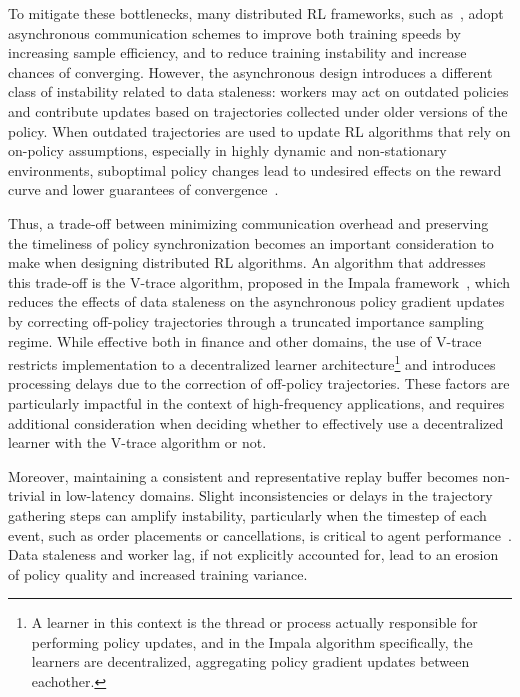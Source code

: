 To mitigate these bottlenecks, many distributed RL frameworks, such as~\cite{Espeholt2018, Mnih2016, Paine2019},
adopt asynchronous communication schemes
to improve both training speeds by increasing sample efficiency, and to reduce training instability and increase chances of converging.
However, the asynchronous design introduces a different class of instability related to data staleness:
workers may act on outdated policies and contribute updates based on trajectories collected under older versions of the policy.
When outdated trajectories are used to update RL algorithms that rely on on-policy assumptions,
especially in highly dynamic and non-stationary environments,
suboptimal policy changes lead to undesired effects on the reward curve and lower guarantees of convergence~\citep{Dai2018}.

Thus, a trade-off between minimizing communication overhead and preserving the timeliness of policy synchronization
becomes an important consideration to make when designing distributed RL algorithms.
An algorithm that addresses this trade-off is the V-trace algorithm, proposed in the Impala framework~\citep{Espeholt2018},
which reduces the effects of data staleness on the asynchronous policy gradient updates by
correcting off-policy trajectories through a truncated importance sampling regime.
While effective both in finance and other domains,
the use of V-trace restricts implementation to a decentralized learner architecture\footnote{
    A learner in this context is the thread or process actually responsible for performing policy updates,
    and in the Impala algorithm specifically, the learners are decentralized, aggregating policy gradient updates between eachother.
} and introduces processing delays due to the correction of off-policy trajectories.
These factors are particularly impactful in the context of high-frequency applications,
and requires additional consideration when deciding whether to effectively use a decentralized learner with the V-trace algorithm or not.

Moreover, maintaining a consistent and representative replay buffer becomes non-trivial in low-latency domains.
Slight inconsistencies or delays in the trajectory gathering steps can amplify instability,
particularly when the timestep of each event, such as order placements or cancellations, is critical to agent performance~\citep{Zhang2024, Kopic2024}.
Data staleness and worker lag, if not explicitly accounted for, lead to an erosion of policy quality and increased training variance.

